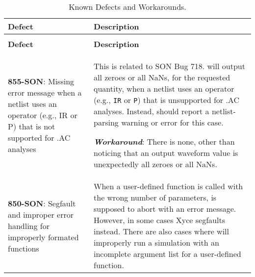 




{
\small

\begin{longtable}[h] {>{\raggedright\small}m{2in}|>{\raggedright\let\\\tabularnewline\small}m{3.5in}}
  \caption{Known Defects and Workarounds.} \\ \hline
  \rowcolor{XyceDarkBlue} \color{white}\bf Defect & \color{white}\bf Description
  \\ \hline \endfirsthead
  \caption[]{Known Defects and Workarounds.} \\ \hline
  \rowcolor{XyceDarkBlue} \color{white}\bf Defect & \color{white}\bf Description
  \\ \hline \endhead

%
%

\textbf{855-SON}: Missing error message when a netlist uses an operator (e.g., IR or P) that 
is not supported for .AC analyses &  This is related to SON Bug 718.  \Xyce{} will output
all zeroes or all NaNs, for the requested quantity, when a netlist uses an operator (e.g., 
\texttt{IR} or \texttt{P}) that is unsupported for .AC analyses.  Instead, \Xyce{} 
should report a netlist-parsing warning or error for this case.

\textbf{\textit{Workaround}}: There is none, other than noticing that an output waveform 
value is unexpectedly all zeroes or all NaNs. \\ \hline

\textbf{850-SON}: Segfault and improper error handling for improperly formated functions &
When a user-defined function is called with the wrong number of parameters, \Xyce{} is supposed to abort 
with an error message.  However, in some cases Xyce segfaults instead.  There are also 
cases where \Xyce{} will improperly run a simulation with an incomplete argument list
for a user-defined function.  


\end{longtable}}
